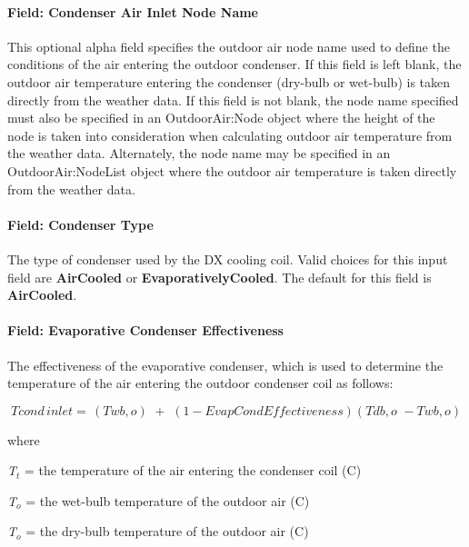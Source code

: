 \paragraph{Field: Condenser Air Inlet Node Name}\label{field-condenser-air-inlet-node-name}

This optional alpha field specifies the outdoor air node name used to define the conditions of the air entering the outdoor condenser. If this field is left blank, the outdoor air temperature entering the condenser (dry-bulb or wet-bulb) is taken directly from the weather data. If this field is not blank, the node name specified must also be specified in an OutdoorAir:Node object where the height of the node is taken into consideration when calculating outdoor air temperature from the weather data. Alternately, the node name may be specified in an OutdoorAir:NodeList object where the outdoor air temperature is taken directly from the weather data.

\paragraph{Field: Condenser Type}\label{field-condenser-type}

The type of condenser used by the DX cooling coil. Valid choices for this input field are \textbf{AirCooled} or \textbf{EvaporativelyCooled}. The default for this field is \textbf{AirCooled}.

\paragraph{Field: Evaporative Condenser Effectiveness}\label{field-evaporative-condenser-effectiveness}

The effectiveness of the evaporative condenser, which is used to determine the temperature of the air entering the outdoor condenser coil as follows:

\begin{equation}
Tcond\,inlet = \,\left( {Twb,o} \right)\,\, + \,\,\left( {1 - EvapCondEffectiveness} \right)\left( {Tdb,o\,\, - Twb,o} \right)
\end{equation}

where

\emph{T\(_{t}\)} = the temperature of the air entering the condenser coil (C)

\emph{T\(_{o}\)} = the wet-bulb temperature of the outdoor air (C)

\emph{T\(_{o}\)} = the dry-bulb temperature of the outdoor air (C)

